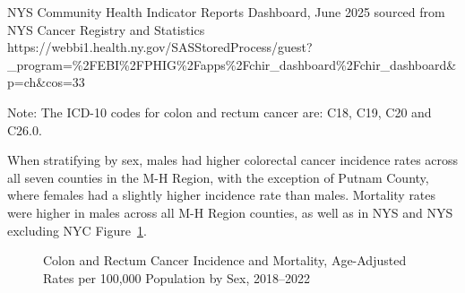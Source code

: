 \documentclass[
  english,
  letterpaper,
]{report}
\begin{document}
\begin{tcolorbox}[enhanced jigsaw, breakable, leftrule=.75mm, title=\textcolor{quarto-callout-note-color}{\faInfo}\hspace{0.5em}{Source}, bottomrule=.15mm, opacityback=0, left=2mm, colback=white, bottomtitle=1mm, coltitle=black, colbacktitle=quarto-callout-note-color!10!white, colframe=quarto-callout-note-color-frame, opacitybacktitle=0.6, toptitle=1mm, titlerule=0mm, arc=.35mm, rightrule=.15mm, toprule=.15mm]

NYS Community Health Indicator Reports Dashboard, June 2025 sourced from
NYS Cancer Registry and Statistics
https://webbi1.health.ny.gov/SASStoredProcess/guest?\_program=\%2FEBI\%2FPHIG\%2Fapps\%2Fchir\_dashboard\%2Fchir\_dashboard\&p=ch\&cos=33

\end{tcolorbox}

\begin{tcolorbox}[enhanced jigsaw, breakable, leftrule=.75mm, title=\textcolor{quarto-callout-note-color}{\faInfo}\hspace{0.5em}{Note}, bottomrule=.15mm, opacityback=0, left=2mm, colback=white, bottomtitle=1mm, coltitle=black, colbacktitle=quarto-callout-note-color!10!white, colframe=quarto-callout-note-color-frame, opacitybacktitle=0.6, toptitle=1mm, titlerule=0mm, arc=.35mm, rightrule=.15mm, toprule=.15mm]

Note: The ICD-10 codes for colon and rectum cancer are: C18, C19, C20
and C26.0.

\end{tcolorbox}

When stratifying by sex, males had higher colorectal cancer incidence
rates across all seven counties in the M-H Region, with the exception of
Putnam County, where females had a slightly higher incidence rate than
males. Mortality rates were higher in males across all M-H Region
counties, as well as in NYS and NYS excluding NYC
Figure~\ref{fig-colonrectca-incident-mortal-sex-aar}.

\begin{figure}


\caption{\label{fig-colonrectca-incident-mortal-sex-aar}Colon and Rectum
Cancer Incidence and Mortality, Age-Adjusted Rates per 100,000
Population by Sex, 2018--2022}

\end{figure}%
\end{document}
